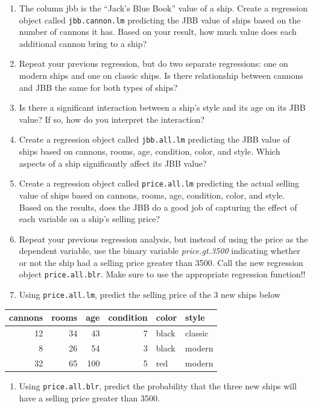 \documentclass[]{book}
\providecommand{\tightlist}{%
  \setlength{\itemsep}{0pt}\setlength{\parskip}{0pt}}
\theoremstyle{definition}
\theoremstyle{definition}
\theoremstyle{remark}
\begin{document}
\begin{enumerate}
\def\labelenumi{\arabic{enumi}.}
\item
  The column jbb is the ``Jack's Blue Book'' value of a ship. Create a
  regression object called \texttt{jbb.cannon.lm} predicting the JBB
  value of ships based on the number of cannons it has. Based on your
  result, how much value does each additional cannon bring to a ship?
\item
  Repeat your previous regression, but do two separate regressions: one
  on modern ships and one on classic ships. Is there relationship
  between cannons and JBB the same for both types of ships?
\item
  Is there a significant interaction between a ship's style and its age
  on its JBB value? If so, how do you interpret the interaction?
\item
  Create a regression object called \texttt{jbb.all.lm} predicting the
  JBB value of ships based on cannons, rooms, age, condition, color, and
  style. Which aspects of a ship significantly affect its JBB value?
\item
  Create a regression object called \texttt{price.all.lm} predicting the
  actual selling value of ships based on cannons, rooms, age, condition,
  color, and style. Based on the results, does the JBB do a good job of
  capturing the effect of each variable on a ship's selling price?
\item
  Repeat your previous regression analysis, but instead of using the
  price as the dependent variable, use the binary variable
  \emph{price.gt.3500} indicating whether or not the ship had a selling
  price greater than 3500. Call the new regression object
  \texttt{price.all.blr}. Make sure to use the appropriate regression
  function!!
\item
  Using \texttt{price.all.lm}, predict the selling price of the 3 new
  ships below
\end{enumerate}

\begin{tabular}{r|r|r|r|l|l}
\hline
cannons & rooms & age & condition & color & style\\
\hline
12 & 34 & 43 & 7 & black & classic\\
\hline
8 & 26 & 54 & 3 & black & modern\\
\hline
32 & 65 & 100 & 5 & red & modern\\
\hline
\end{tabular}

\begin{enumerate}
\def\labelenumi{\arabic{enumi}.}
\setcounter{enumi}{7}
\tightlist
\item
  Using \texttt{price.all.blr}, predict the probability that the three
  new ships will have a selling price greater than 3500.
\end{enumerate}
\end{document}
